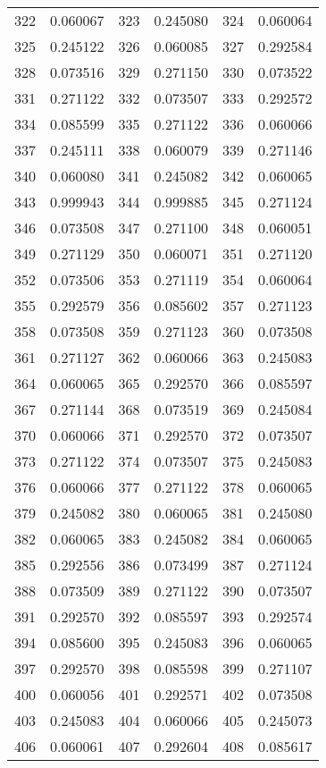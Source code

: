 \documentclass[12pt]{article}
\begin{document}
\begin{longtable}{@{}cc|cc|cc@{}}
322 & 0.060067 & 323 & 0.245080 & 324 & 0.060064 \\
325 & 0.245122 & 326 & 0.060085 & 327 & 0.292584 \\
328 & 0.073516 & 329 & 0.271150 & 330 & 0.073522 \\
331 & 0.271122 & 332 & 0.073507 & 333 & 0.292572 \\
334 & 0.085599 & 335 & 0.271122 & 336 & 0.060066 \\
337 & 0.245111 & 338 & 0.060079 & 339 & 0.271146 \\
340 & 0.060080 & 341 & 0.245082 & 342 & 0.060065 \\
343 & 0.999943 & 344 & 0.999885 & 345 & 0.271124 \\
346 & 0.073508 & 347 & 0.271100 & 348 & 0.060051 \\
349 & 0.271129 & 350 & 0.060071 & 351 & 0.271120 \\
352 & 0.073506 & 353 & 0.271119 & 354 & 0.060064 \\
355 & 0.292579 & 356 & 0.085602 & 357 & 0.271123 \\
358 & 0.073508 & 359 & 0.271123 & 360 & 0.073508 \\
361 & 0.271127 & 362 & 0.060066 & 363 & 0.245083 \\
364 & 0.060065 & 365 & 0.292570 & 366 & 0.085597 \\
367 & 0.271144 & 368 & 0.073519 & 369 & 0.245084 \\
370 & 0.060066 & 371 & 0.292570 & 372 & 0.073507 \\
373 & 0.271122 & 374 & 0.073507 & 375 & 0.245083 \\
376 & 0.060066 & 377 & 0.271122 & 378 & 0.060065 \\
379 & 0.245082 & 380 & 0.060065 & 381 & 0.245080 \\
382 & 0.060065 & 383 & 0.245082 & 384 & 0.060065 \\
385 & 0.292556 & 386 & 0.073499 & 387 & 0.271124 \\
388 & 0.073509 & 389 & 0.271122 & 390 & 0.073507 \\
391 & 0.292570 & 392 & 0.085597 & 393 & 0.292574 \\
394 & 0.085600 & 395 & 0.245083 & 396 & 0.060065 \\
397 & 0.292570 & 398 & 0.085598 & 399 & 0.271107 \\
400 & 0.060056 & 401 & 0.292571 & 402 & 0.073508 \\
403 & 0.245083 & 404 & 0.060066 & 405 & 0.245073 \\
406 & 0.060061 & 407 & 0.292604 & 408 & 0.085617 \\

\end{longtable}
\end{document}
